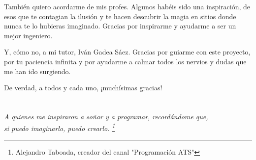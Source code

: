 También quiero acordarme de mis profes. Algunos habéis sido una inspiración, de esos que te contagian la ilusión y te hacen descubrir la magia en sitios donde nunca te lo hubieras imaginado. Gracias por inspirarme y ayudarme a ser un mejor ingeniero.

Y, cómo no, a mi tutor, Iván Gadea Sáez. Gracias por guiarme con este proyecto, por tu paciencia infinita y por ayudarme a calmar todos los nervios y dudas que me han ido surgiendo.

De verdad, a todos y cada uno, ¡muchísimas gracias!

\cleardoublepage %
\chapter*{}
\setlength{\leftmargin}{0.5\textwidth}
\setlength{\parsep}{0cm}
\addtolength{\topsep}{0.5cm}
\begin{flushright}
\small\em{
A quienes me inspiraron a soñar y a programar, recordándome que,\\
si puedo imaginarlo, puedo crearlo. \footnote{Alejandro Taboada, creador del canal "Programación ATS"}
}
\end{flushright}
